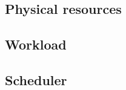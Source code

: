 

\subsection{Physical resources} \label{simulator_cell}


\subsection{Workload}


\subsection{Scheduler}
